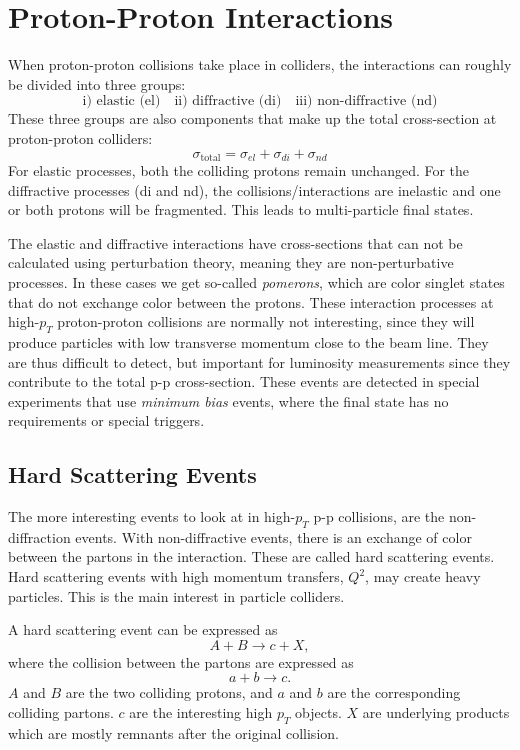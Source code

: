\documentclass[a4paper, american, 12pt]{report}
\begin{document}

	\section{Proton-Proton Interactions}
	\label{sect:Theory-P-P_interactions}
	When proton-proton collisions take place in colliders, the interactions can roughly be divided into three groups:
	\[\text{i) elastic (el)}\quad \text{ii) diffractive (di)}\quad \text{iii) non-diffractive (nd)}\]
	These three groups are also components that make up the total cross-section at proton-proton colliders:
	\begin{equation}
	\label{eq:Cross-section}
		\sigma_{\text{total}}=\sigma_{el}+\sigma_{di}+\sigma_{nd}
	\end{equation}
	For elastic processes, both the colliding protons remain unchanged. For the diffractive processes (di and nd), the collisions/interactions are inelastic and one or both protons will be fragmented. This leads to multi-particle final states. 
	
	The elastic and diffractive interactions have cross-sections that can not be calculated using perturbation theory, meaning they are non-perturbative processes. In these cases we get so-called \textit{pomerons}, which are color singlet states that do not exchange color between the protons. These interaction processes at high-$p_T$ proton-proton collisions are normally not interesting, since they will produce particles with low transverse momentum close to the beam line. They are thus difficult to detect, but important for luminosity measurements since they contribute to the total p-p cross-section. These events are detected in special experiments that use \textit{minimum bias} events, where the final state has no requirements or special triggers. 
	
	
	\subsection{Hard Scattering Events}
	\label{subsect:Theory-Hard_scattering}
	The more interesting events to look at in high-$p_T$ p-p collisions, are the non-diffraction events. With non-diffractive events, there is an exchange of color between the partons in the interaction. These are called hard scattering events. Hard scattering events with high momentum transfers, $Q^2$, may create heavy particles. This is the main interest in particle colliders. 
	
	A hard scattering event can be expressed as
	\begin{equation}
	\label{eq:Hard_scattering}
	A+B\rightarrow c+X,
	\end{equation}
	where the collision between the partons are expressed as
	\begin{equation}
	\label{eq:Hard_scattering_partons}
	a+b\rightarrow c.
	\end{equation}
	$A$ and $B$ are the two colliding protons, and $a$ and $b$ are the corresponding colliding partons. $c$ are the interesting high $p_T$ objects. $X$ are underlying products which are mostly remnants after the original collision.
	
\end{document}
